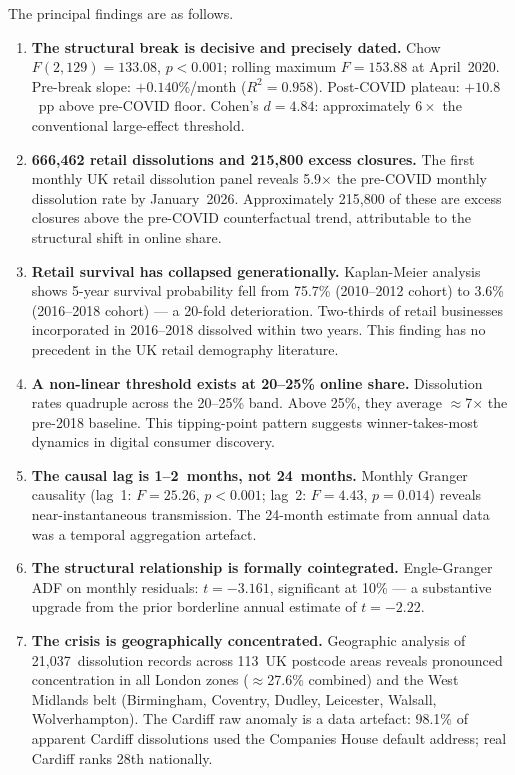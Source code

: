 \documentclass[12pt,a4paper]{article}
\begin{document}
The principal findings are as follows.

\begin{enumerate}[leftmargin=*, label=\arabic*.]

\item \textbf{The structural break is decisive and precisely dated.}
  Chow $F(2,129)=133.08$, $p<0.001$; rolling maximum $F=153.88$ at April~2020.
  Pre-break slope: $+0.140$\%/month ($R^2=0.958$). Post-COVID plateau:
  $+10.8$~pp above pre-COVID floor. Cohen's $d=4.84$: approximately $6\times$
  the conventional large-effect threshold.

\item \textbf{666,462 retail dissolutions and 215,800 excess closures.}
  The first monthly UK retail dissolution panel reveals 5.9$\times$ the pre-COVID
  monthly dissolution rate by January~2026. Approximately 215,800 of these are excess
  closures above the pre-COVID counterfactual trend, attributable to the structural shift
  in online share.

\item \textbf{Retail survival has collapsed generationally.}
  Kaplan-Meier analysis shows 5-year survival probability fell from 75.7\%
  (2010--2012 cohort) to 3.6\% (2016--2018 cohort) --- a 20-fold deterioration.
  Two-thirds of retail businesses incorporated in 2016--2018 dissolved within two years.
  This finding has no precedent in the UK retail demography literature.

\item \textbf{A non-linear threshold exists at 20--25\% online share.}
  Dissolution rates quadruple across the 20--25\% band. Above 25\%, they average
  $\approx$7$\times$ the pre-2018 baseline. This tipping-point pattern suggests
  winner-takes-most dynamics in digital consumer discovery.

\item \textbf{The causal lag is 1--2~months, not 24~months.}
  Monthly Granger causality (lag~1: $F=25.26$, $p<0.001$; lag~2: $F=4.43$, $p=0.014$)
  reveals near-instantaneous transmission. The 24-month estimate from annual data was a
  temporal aggregation artefact.

\item \textbf{The structural relationship is formally cointegrated.}
  Engle-Granger ADF on monthly residuals: $t=-3.161$, significant at 10\% ---
  a substantive upgrade from the prior borderline annual estimate of $t=-2.22$.

\item \textbf{The crisis is geographically concentrated.}
  Geographic analysis of 21,037~dissolution records across 113~UK postcode areas reveals
  pronounced concentration in all London zones ($\approx$27.6\% combined) and the West
  Midlands belt (Birmingham, Coventry, Dudley, Leicester, Walsall, Wolverhampton).
  The Cardiff raw anomaly is a data artefact: 98.1\% of apparent Cardiff dissolutions
  used the Companies House default address; real Cardiff ranks 28th nationally.


\end{enumerate}
\end{document}
